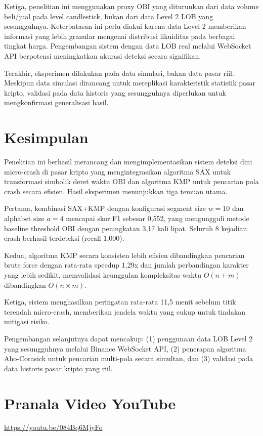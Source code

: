 \documentclass[conference]{IEEEtran}
\begin{document}
Ketiga, penelitian ini menggunakan proxy OBI yang diturunkan dari data volume beli/jual pada level candlestick, bukan dari data Level 2 LOB yang sesungguhnya. Keterbatasan ini perlu diakui karena data Level 2 memberikan informasi yang lebih granular mengenai distribusi likuiditas pada berbagai tingkat harga. Pengembangan sistem dengan data LOB real melalui WebSocket API berpotensi meningkatkan akurasi deteksi secara signifikan.

Terakhir, eksperimen dilakukan pada data simulasi, bukan data pasar riil. Meskipun data simulasi dirancang untuk mereplikasi karakteristik statistik pasar kripto, validasi pada data historis yang sesungguhnya diperlukan untuk mengkonfirmasi generalisasi hasil.

\section{Kesimpulan}

Penelitian ini berhasil merancang dan mengimplementasikan sistem deteksi dini micro-crash di pasar kripto yang mengintegrasikan algoritma SAX untuk transformasi simbolik deret waktu OBI dan algoritma KMP untuk pencarian pola crash secara efisien. Hasil eksperimen menunjukkan tiga temuan utama.

Pertama, kombinasi SAX+KMP dengan konfigurasi segment size $w{=}10$ dan alphabet size $a{=}4$ mencapai skor F1 sebesar 0,552, yang mengungguli metode baseline threshold OBI dengan peningkatan 3,17 kali lipat. Seluruh 8 kejadian crash berhasil terdeteksi (recall 1,000).

Kedua, algoritma KMP secara konsisten lebih efisien dibandingkan pencarian brute force dengan rata-rata speedup 1,29x dan jumlah perbandingan karakter yang lebih sedikit, memvalidasi keunggulan kompleksitas waktu $O(n+m)$ dibandingkan $O(n \times m)$.

Ketiga, sistem menghasilkan peringatan rata-rata 11,5 menit sebelum titik terendah micro-crash, memberikan jendela waktu yang cukup untuk tindakan mitigasi risiko.

Pengembangan selanjutnya dapat mencakup: (1) penggunaan data LOB Level 2 yang sesungguhnya melalui Binance WebSocket API, (2) penerapan algoritma Aho-Corasick untuk pencarian multi-pola secara simultan, dan (3) validasi pada data historis pasar kripto yang riil.

\section*{Pranala Video YouTube}
\url{https://youtu.be/084Bq6MjyFo}
\end{document}
